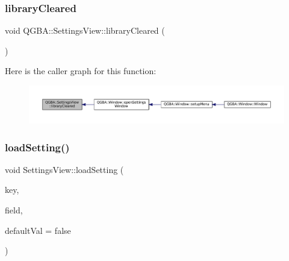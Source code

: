 \subsubsection{\texorpdfstring{library\+Cleared}{libraryCleared}}
{\footnotesize\ttfamily void Q\+G\+B\+A\+::\+Settings\+View\+::library\+Cleared (\begin{DoxyParamCaption}{ }\end{DoxyParamCaption})\hspace{0.3cm}{\ttfamily [signal]}}

Here is the caller graph for this function\+:
\nopagebreak
\begin{figure}[H]
\begin{center}
\leavevmode
\includegraphics[width=350pt]{class_q_g_b_a_1_1_settings_view_a8d85dfc8109c16b93ec7adae18f27da8_icgraph}
\end{center}
\end{figure}
\mbox{\label{class_q_g_b_a_1_1_settings_view_aa3ea5e48a361a04fdd17a0fce6eeed26}} 
\subsubsection{\texorpdfstring{load\+Setting()}{loadSetting()}\hspace{0.1cm}{\footnotesize\ttfamily [1/7]}}
{\footnotesize\ttfamily void Settings\+View\+::load\+Setting (\begin{DoxyParamCaption}\item[{const char $\ast$}]{key,  }\item[{Q\+Abstract\+Button $\ast$}]{field,  }\item[{\mbox{\hyperlink{libretro_8h_a4a26dcae73fb7e1528214a068aca317e}{bool}}}]{default\+Val = {\ttfamily false} }\end{DoxyParamCaption})\hspace{0.3cm}{\ttfamily [private]}}

